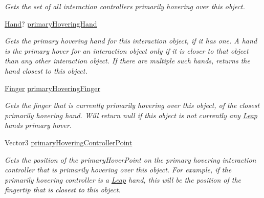 \begin{DoxyCompactItemize}
\begin{DoxyCompactList}\small\item\em Gets the set of all interaction controllers primarily hovering over this object. \end{DoxyCompactList}\item 
\mbox{\hyperlink{class_leap_1_1_hand}{Hand}}? \mbox{\hyperlink{class_leap_1_1_unity_1_1_interaction_1_1_interaction_behaviour_a856190a94c40baea953a74cd15dedc29}{primary\+Hovering\+Hand}}
\begin{DoxyCompactList}\small\item\em Gets the primary hovering hand for this interaction object, if it has one. A hand is the primary hover for an interaction object only if it is closer to that object than any other interaction object. If there are multiple such hands, returns the hand closest to this object. \end{DoxyCompactList}\item 
\mbox{\hyperlink{class_leap_1_1_finger}{Finger}} \mbox{\hyperlink{class_leap_1_1_unity_1_1_interaction_1_1_interaction_behaviour_a7810b944120ba2c2207071ca660967b2}{primary\+Hovering\+Finger}}
\begin{DoxyCompactList}\small\item\em Gets the finger that is currently primarily hovering over this object, of the closest primarily hovering hand. Will return null if this object is not currently any \mbox{\hyperlink{namespace_leap_1_1_unity_1_1_leap}{Leap}} hand\textquotesingle{}s primary hover. \end{DoxyCompactList}\item 
Vector3 \mbox{\hyperlink{class_leap_1_1_unity_1_1_interaction_1_1_interaction_behaviour_aebc14659cfc1f85f97c2fa0a8e659787}{primary\+Hovering\+Controller\+Point}}
\begin{DoxyCompactList}\small\item\em Gets the position of the primary\+Hover\+Point on the primary hovering interaction controller that is primarily hovering over this object. For example, if the primarily hovering controller is a \mbox{\hyperlink{namespace_leap_1_1_unity_1_1_leap}{Leap}} hand, this will be the position of the fingertip that is closest to this object. \end{DoxyCompactList}\item 

\end{DoxyCompactItemize}
